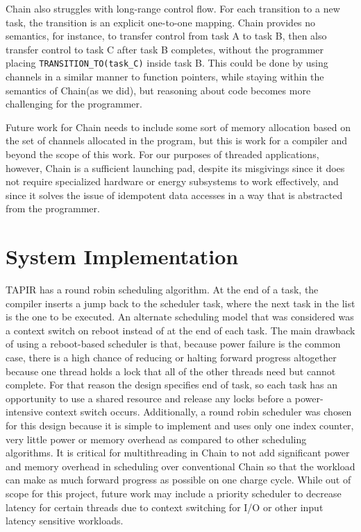 \documentclass[11pt]{sensys-proc}
\newcommand{\chain}{Chain\xspace}
\begin{document}
\chain also struggles with long-range control flow. For each transition to a
new task, the transition is an explicit one-to-one mapping. \chain provides no
semantics, for instance, to transfer control from task A to task B, then also
transfer control to task C after task B completes, without the programmer
placing \texttt{TRANSITION\_TO(task\_C)} inside task B. This could be done by
using channels in a similar manner to function pointers, while staying within
the semantics of \chain (as we did), but reasoning about code becomes more
challenging for the programmer.


Future work for \chain needs to include some sort of memory allocation based on
the set of channels allocated in the program, but this is work for a compiler
and beyond the scope of this work. For our purposes of threaded applications,
however, \chain is a sufficient launching pad, despite its misgivings since it
does not require specialized hardware or energy subsystems to work effectively,
and since it solves the issue of idempotent data accesses in a way that is
abstracted from the programmer.


\section{System Implementation}
TAPIR has a round robin scheduling algorithm. At the end of a task, the compiler
inserts a jump back to the scheduler task, where the next task in the list is
the one to be executed. An alternate scheduling model that was considered was
a context switch on reboot instead of at the end of each task. The main drawback
of using a reboot-based scheduler is that, because power failure is the common
case, there is a high chance of reducing or halting forward progress altogether
because one thread holds a lock that all of the other threads need but cannot
complete. For that reason the design specifies end of task, so each task has
an opportunity to use a shared resource and release any locks before a power-
intensive context switch occurs. Additionally, a round robin scheduler was
chosen for this design because it is simple to implement and uses only one index counter,
very little power or memory overhead as compared to other scheduling algorithms. It is
critical for multithreading in Chain to not add significant power and memory
overhead in scheduling over conventional Chain so that the workload can
make as much forward progress as possible on one charge cycle. While out of
scope for this project, future work may include a priority scheduler to decrease
latency for certain threads due to context switching for I/O or other input latency
sensitive workloads.
\end{document}
